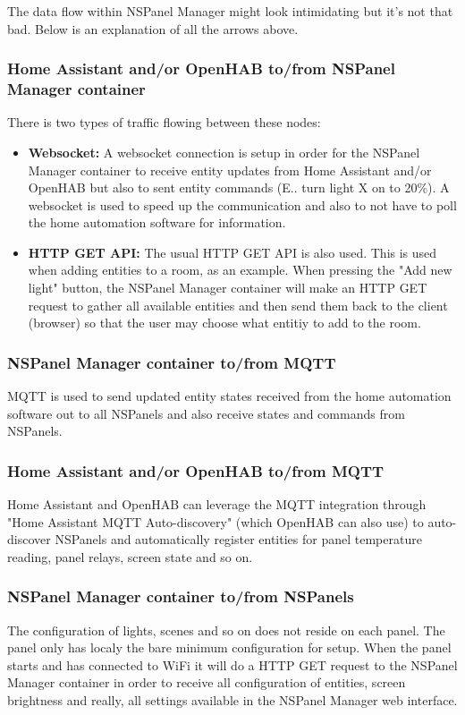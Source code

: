 \documentclass[10pt]{article}
\begin{document}
    The data flow within NSPanel Manager might look intimidating but it's not that bad. Below is an explanation of all the arrows above.

    
    \subsubsection{Home Assistant and/or OpenHAB to/from NSPanel Manager container}
    There is two types of traffic flowing between these nodes:
    \begin{itemize}
      \item \textbf{Websocket:} A websocket connection is setup in order for the NSPanel Manager container to receive entity updates from Home Assistant and/or OpenHAB but also to sent entity commands (E.. turn light X on to 20\%). A websocket is used to speed up the communication and also to not have to poll the home automation software for information.
      \item \textbf{HTTP GET API:} The usual HTTP GET API is also used. This is used when adding entities to a room, as an example. When pressing the "Add new light" button, the NSPanel Manager container will make an HTTP GET request to gather all available entities and then send them back to the client (browser) so that the user may choose what entitiy to add to the room.
    \end{itemize}
    \subsubsection{NSPanel Manager container to/from MQTT}
    MQTT is used to send updated entity states received from the home automation software out to all NSPanels and also receive states and commands from NSPanels.
    \subsubsection{Home Assistant and/or OpenHAB to/from MQTT}
    Home Assistant and OpenHAB can leverage the MQTT integration through "Home Assistant MQTT Auto-discovery" (which OpenHAB can also use) to auto-discover NSPanels and automatically register entities for panel temperature reading, panel relays, screen state and so on.
    \subsubsection{NSPanel Manager container to/from NSPanels}
    The configuration of lights, scenes and so on does not reside on each panel. The panel only has localy the bare minimum configuration for setup. When the panel starts and has connected to WiFi it will do a HTTP GET request to the NSPanel Manager container in order to receive all configuration of entities, screen brightness and really, all settings available in the NSPanel Manager web interface.
\end{document}
